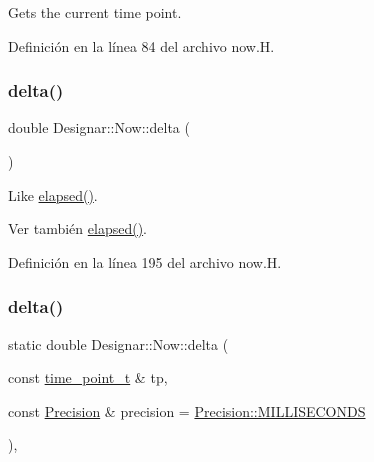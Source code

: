 Gets the current time point. 



Definición en la línea 84 del archivo now.\+H.

\mbox{\label{class_designar_1_1_now_ae2a46a7ff8392fbadc9fb28ee17f7f5a}} 
\subsubsection{\texorpdfstring{delta()}{delta()}\hspace{0.1cm}{\footnotesize\ttfamily [1/2]}}
{\footnotesize\ttfamily double Designar\+::\+Now\+::delta (\begin{DoxyParamCaption}{ }\end{DoxyParamCaption})\hspace{0.3cm}{\ttfamily [inline]}}

Like \hyperlink{class_designar_1_1_now_a3219d85172fc9628ef90f66c1d69a8e0}{elapsed()}.

\begin{DoxySeeAlso}{Ver también}
\hyperlink{class_designar_1_1_now_a3219d85172fc9628ef90f66c1d69a8e0}{elapsed()}. 
\end{DoxySeeAlso}


Definición en la línea 195 del archivo now.\+H.

\mbox{\label{class_designar_1_1_now_a413d1f85c9cc6ac8dde02538bce052f2}} 
\subsubsection{\texorpdfstring{delta()}{delta()}\hspace{0.1cm}{\footnotesize\ttfamily [2/2]}}
{\footnotesize\ttfamily static double Designar\+::\+Now\+::delta (\begin{DoxyParamCaption}\item[{const \hyperlink{namespace_designar_a0edbd598eadb672df2c70e5af4dfccee}{time\+\_\+point\+\_\+t} \&}]{tp,  }\item[{const \hyperlink{class_designar_1_1_now_a3c9f5e57907c88cbe63c70a64638c072}{Precision} \&}]{precision = {\ttfamily \hyperlink{class_designar_1_1_now_a3c9f5e57907c88cbe63c70a64638c072ab4fd5e5c06e72437a57379576df36936}{Precision\+::\+M\+I\+L\+L\+I\+S\+E\+C\+O\+N\+DS}} }\end{DoxyParamCaption})\hspace{0.3cm}{\ttfamily [inline]}, {\ttfamily [static]}}

